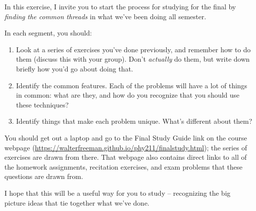 \documentclass[12pt]{article}
\begin{document}
\Large
\centerline{}
\normalsize
\centerline{}

In this exercise, I invite you to start the process for studying for the final by {\it finding the common threads} in what we've been doing all semester. 

In each segment, you should:

\begin{enumerate}
	\item Look at a series of exercises you've done previously, and remember how to do them (discuss this with your group). Don't {\it actually} do them, but write down briefly how you'd go about doing that.
	\item Identify the common features. Each of the problems will have a lot of things in common: what are they, and how do you recognize that you should use these techniques?
	\item Identify things that make each problem unique. What's different about them?
\end{enumerate}

You should get out a laptop and go to the Final Study Guide link on the course webpage (\url{https://walterfreeman.github.io/phy211/finalstudy.html}); the series of exercises are drawn from there. That webpage also contains direct links to all of the homework assignments, recitation exercises, and exam problems that these questions are drawn from.

\vspace{1in}

I hope that this will be a useful way for you to study -- recognizing the big picture ideas that tie together what we've done.

\newpage
\end{document}
